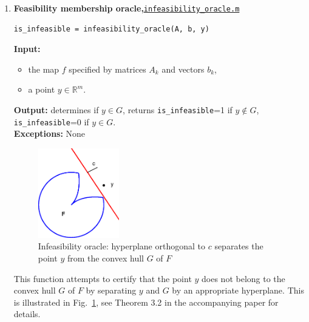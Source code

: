 \documentclass[a4paper]{article}
\theoremstyle{definition}
\begin{document}
\begin{enumerate}
\item {\bf Feasibility membership oracle,\hskip 6pt}\underline{\tt  infeasibility\_oracle.m}
\begin{verbatim}
is_infeasible = infeasibility_oracle(A, b, y)
\end{verbatim}
{\bf Input:}
\begin{itemize}
\item the map $f$ specified by matrices $A_k$ and vectors $b_k$,
\item a point $y\in\mathbb{R}^m$.
\end{itemize}
{\bf Output:} determines if $y\in G$, returns {\tt is\_infeasible}=1 if $y\notin G$, {\tt is\_infeasible}=0 if $y\in G$.\\
{\bf Exceptions:} None

\begin{figure}[H]
	\centering\includegraphics[width=100pt]{fig/infeasibility_oracle}\captionsetup{width=.8\linewidth}
	\caption{Infeasibility oracle: hyperplane orthogonal to $c$ separates the point $y$ from the convex hull $G$ of $F$}
\label{fig:one}
\end{figure}

This function attempts to certify that the point $y$ does not belong to the convex hull $G$ of $F$ by separating $y$ and $G$ by an appropriate hyperplane.
This is illustrated in Fig.~\ref{fig:one}, see Theorem 3.2 in the accompanying paper for details.


\end{enumerate}
\end{document}
